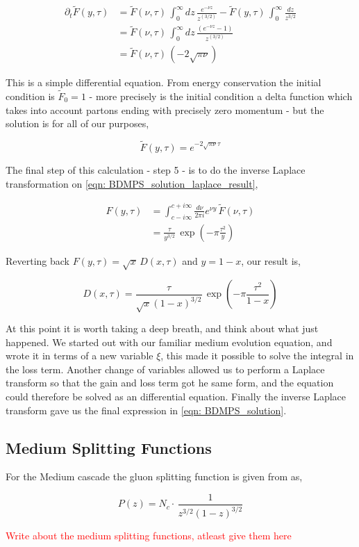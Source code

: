 \documentclass[main.tex]{subfiles}
\begin{document}
\begin{align}\label{eqn: BDMPS_solution_laplace_step2}
    \partial_t \tilde{F}(y,\tau) &= \tilde{F}(\nu, \tau) \, \int_0^\infty dz\, \frac{e^{-\nu z}}{z^{(3/2)}} - \tilde{F}(y,\tau) \, \int_0^\infty \frac{dz}{z^{3/2}} \nonumber \\
    &= \tilde{F}(\nu, \tau) \, \int_0^\infty dz\, \frac{(e^{-\nu z}-1)}{z^{(3/2)}} \nonumber \\
    &= \tilde{F}(\nu, \tau) \, (-2 \sqrt{\pi \nu})
\end{align}

This is a simple differential equation. From energy conservation the initial condition is \(\tilde{F}_0 = 1\) - more precisely is the initial condition a delta function which takes into account partons ending with precisely zero momentum - but the solution is for all of our purposes, 

\begin{equation}\label{eqn: BDMPS_solution_laplace_result}
    \tilde{F}(y,\tau) = e^{-2\sqrt{\pi \nu}\tau}
\end{equation}

The final step of this calculation - step 5 - is to do the inverse Laplace transformation on \autoref{eqn: BDMPS_solution_laplace_result},

\begin{align}
    F(y,\tau) &= \int_{c-i\infty}^{c+i\infty} \frac{d\nu}{2\pi i} e^{\nu y} \,\tilde{F}(\nu,\tau) \nonumber \\
    &= \frac{\tau}{y^{3/2}} \, \exp\left(-\pi \frac{\tau^2}{y}\right)
\end{align}

Reverting back \(F(y,\tau) = \sqrt{x}\, D(x,\tau)\) and \(y = 1-x\), our result is, 

\begin{equation}\label{eqn: BDMPS_solution}
    D(x,\tau ) = \frac{\tau}{\sqrt{x}(1-x)^{3/2}}\, \exp\left(-\pi \frac{\tau^2}{1-x}\right)
\end{equation}

At this point it is worth taking a deep breath, and think about what just happened. We started out with our familiar medium evolution equation, and wrote it in terms of a new variable \(\xi\), this made it possible to solve the integral in the loss term. Another change of variables allowed us to perform a Laplace transform so that the gain and loss term got he same form, and the equation could therefore be solved as an differential equation. Finally the inverse Laplace transform gave us the final expression in \autoref{eqn: BDMPS_solution}.


\subsection{Medium Splitting Functions}
For the Medium cascade the gluon splitting function is given from \cite{Energy_flow_medium_cascade_2016} as, 

\begin{equation}\label{eqn: ggg_medium_splitting_function}
    P(z) = N_c \cdot \, \frac{1}{z^{3/2}(1-z)^{3/2}}
\end{equation}

\textcolor{red}{Write about the medium splitting functions, atleast give them here}
\end{document}
